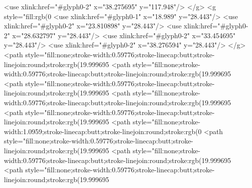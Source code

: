   <use xlink:href="#glyph0-2" x="38.275695" y="117.948"/>
</g>
<g style="fill:rgb(0%
  <use xlink:href="#glyph0-1" x="18.989" y="28.443"/>
  <use xlink:href="#glyph0-2" x="23.810898" y="28.443"/>
  <use xlink:href="#glyph0-2" x="28.632797" y="28.443"/>
  <use xlink:href="#glyph0-2" x="33.454695" y="28.443"/>
  <use xlink:href="#glyph0-2" x="38.276594" y="28.443"/>
</g>
<path style="fill:none;stroke-width:0.59776;stroke-linecap:butt;stroke-linejoin:round;stroke:rgb(19.999695%
<path style="fill:none;stroke-width:0.59776;stroke-linecap:butt;stroke-linejoin:round;stroke:rgb(19.999695%
<path style="fill:none;stroke-width:0.59776;stroke-linecap:butt;stroke-linejoin:round;stroke:rgb(19.999695%
<path style="fill:none;stroke-width:0.59776;stroke-linecap:butt;stroke-linejoin:round;stroke:rgb(19.999695%
<path style="fill:none;stroke-width:0.59776;stroke-linecap:butt;stroke-linejoin:round;stroke:rgb(19.999695%
<path style="fill:none;stroke-width:1.0959;stroke-linecap:butt;stroke-linejoin:round;stroke:rgb(0%
<path style="fill:none;stroke-width:0.59776;stroke-linecap:butt;stroke-linejoin:round;stroke:rgb(19.999695%
<path style="fill:none;stroke-width:0.59776;stroke-linecap:butt;stroke-linejoin:round;stroke:rgb(19.999695%
<path style="fill:none;stroke-width:0.59776;stroke-linecap:butt;stroke-linejoin:round;stroke:rgb(19.999695%
